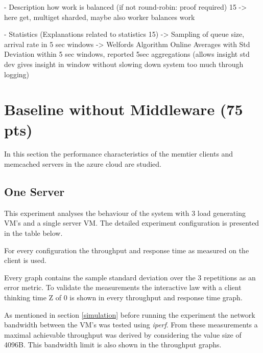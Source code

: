\documentclass[11pt,a4paper]{article}
\begin{document}
- Description how work is balanced (if not round-robin: proof required) 15 
-> here get, multiget sharded, maybe also worker balances work

- Statistics (Explanations related to statistics 15)
-> Sampling of queue size, arrival rate in 5 sec windows
-> Welfords Algorithm Online Averages with Std Deviation within 5 sec windows, reported 5sec aggregations (allows insight std dev gives insight in window without slowing down system too much through logging)


\section{Baseline without Middleware (75 pts)}\label{exp2}

In this section the performance characteristics of the memtier clients and memcached servers in the azure cloud are studied.

\subsection{One Server}\label{exp21}



This experiment analyses the behaviour of the system with 3 load generating VM's and a single server VM. The detailed experiment configuration is presented in the table below.

For every configuration the throughput and response time as measured on the client is used.

Every graph contains the sample standard deviation over the 3 repetitions as an error metric.
To validate the measurements the interactive law with a client thinking time Z of 0 is shown in every throughput and response time graph.

As mentioned in section \ref{simulation} before running the experiment the network bandwidth between the VM's was tested using \emph{iperf}. From these measurements a maximal achievable throughput was derived by considering the value size of 4096B. This bandwidth limit is also shown in the throughput graphs.
\end{document}
